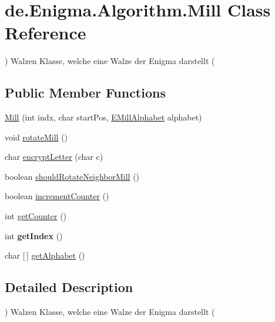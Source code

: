\hypertarget{classde_1_1_enigma_1_1_algorithm_1_1_mill}{}\section{de.\+Enigma.\+Algorithm.\+Mill Class Reference}
\label{classde_1_1_enigma_1_1_algorithm_1_1_mill}


) Walzen Klasse, welche eine Walze der Enigma darstellt (  


\subsection*{Public Member Functions}
\begin{DoxyCompactItemize}
\item 
\hyperlink{classde_1_1_enigma_1_1_algorithm_1_1_mill_a51ac880f27208e0762445a6e6bce24a0}{Mill} (int indx, char start\+Pos, \hyperlink{enumde_1_1_enigma_1_1_util_1_1_enums_1_1_e_mill_alphabet}{E\+Mill\+Alphabet} alphabet)
\item 
void \hyperlink{classde_1_1_enigma_1_1_algorithm_1_1_mill_ae84e4853d3e2d32451a85a6cc8c8591d}{rotate\+Mill} ()
\item 
char \hyperlink{classde_1_1_enigma_1_1_algorithm_1_1_mill_a7201e679705b6e4aa83d4bd9f93d9225}{encrypt\+Letter} (char c)
\item 
boolean \hyperlink{classde_1_1_enigma_1_1_algorithm_1_1_mill_ade4280b579540485a67e742202682cbf}{should\+Rotate\+Neighbor\+Mill} ()
\item 
boolean \hyperlink{classde_1_1_enigma_1_1_algorithm_1_1_mill_aae7227370833f461949d06851d5bacfc}{increment\+Counter} ()
\item 
int \hyperlink{classde_1_1_enigma_1_1_algorithm_1_1_mill_ae1c1cca1acd55ad6f5c86f811253bac8}{get\+Counter} ()
\item 
\mbox{\label{classde_1_1_enigma_1_1_algorithm_1_1_mill_a9897c1aff95924a8723a884e2b511b14}} 
int {\bfseries get\+Index} ()
\item 
char \mbox{[}$\,$\mbox{]} \hyperlink{classde_1_1_enigma_1_1_algorithm_1_1_mill_a918c53ae722325d91c19cea90fdbedb1}{get\+Alphabet} ()
\end{DoxyCompactItemize}


\subsection{Detailed Description}
) Walzen Klasse, welche eine Walze der Enigma darstellt ( 

